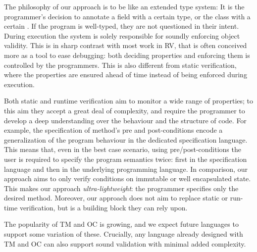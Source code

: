 
\loseSpace
The philosophy of our approach is to be like an extended type system: 
It is the programmer's decision
to annotate a field with a certain type,
or the class with a certain \validate.
If the program is well-typed, they are not questioned in their intent.
During execution the system is solely responsible for soundly enforcing object validity.
This is in sharp contrast with most work in RV, that is often conceived more as a tool to ease debugging:
both deciding properties and enforcing them is controlled by the programmers.
This is also different from static verification,
where the properties are ensured ahead of time instead of being enforced during execution.

Both static and runtime verification
aim to monitor a wide range of properties; to this aim they accept a 
great deal of complexity, and require the programmer to develop a deep understanding
over the behaviour and the structure of code.
For example, the specification of method’s pre and post-conditions
encode a generalization of the program behaviour in the dedicated specification language.
This means that, even in the best case scenario, 
using pre/post-conditions the user is required to specify the program semantics twice:
first in the specification language and then in the underlying programming language.
In comparison, our approach aims to only verify conditions on immutable or well encapsulated state.
This makes our approach \emph{ultra-lightweight}:
the programmer specifies only the desired \validate{} method.
Moreover, our approach does not aim to replace static or run-time verification,
but is a building block they can rely upon.

The popularity of TM and OC is growing, and we expect future languages to support some variation of these.
Crucially, any language already designed with TM and OC
can also support sound validation with minimal added complexity.